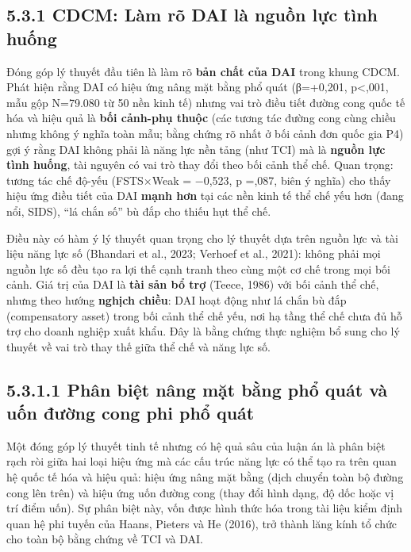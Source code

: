 \documentclass[
  a4paper,
  13pt]{extreport}
\begin{document}
\hypertarget{cdcm-luxe0m-ruxf5-dai-luxe0-nguux1ed3n-lux1ef1c-tuxecnh-huux1ed1ng}{%
\subsection{5.3.1 CDCM: Làm rõ DAI là nguồn lực tình
huống}\label{cdcm-luxe0m-ruxf5-dai-luxe0-nguux1ed3n-lux1ef1c-tuxecnh-huux1ed1ng}}

Đóng góp lý thuyết đầu tiên là làm rõ \textbf{bản chất của DAI} trong
khung CDCM. Phát hiện rằng DAI có hiệu ứng nâng mặt bằng phổ quát
(β=+0,201, p\textless,001, mẫu gộp N=79.080 từ 50 nền kinh tế) nhưng vai
trò điều tiết đường cong quốc tế hóa và hiệu quả là \textbf{bối cảnh-phụ
thuộc} (các tương tác đường cong cùng chiều nhưng không ý nghĩa toàn
mẫu; bằng chứng rõ nhất ở bối cảnh đơn quốc gia P4) gợi ý rằng DAI không
phải là năng lực nền tảng (như TCI) mà là \textbf{nguồn lực tình huống},
tài nguyên có vai trò thay đổi theo bối cảnh thể chế. Quan trọng: tương
tác chế độ-yếu (FSTS×Weak = −0,523, p =,087, biên ý nghĩa) cho thấy hiệu
ứng điều tiết của DAI \textbf{mạnh hơn} tại các nền kinh tế thể chế yếu
hơn (đang nổi, SIDS), ``lá chắn số'' bù đắp cho thiếu hụt thể chế.

Điều này có hàm ý lý thuyết quan trọng cho lý thuyết dựa trên nguồn lực
và tài liệu năng lực số (Bhandari et al., 2023; Verhoef et al., 2021):
không phải mọi nguồn lực số đều tạo ra lợi thế cạnh tranh theo cùng một
cơ chế trong mọi bối cảnh. Giá trị của DAI là \textbf{tài sản bổ trợ}
(Teece, 1986) với bối cảnh thể chế, nhưng theo hướng \textbf{nghịch
chiều}: DAI hoạt động như lá chắn bù đắp (compensatory asset) trong bối
cảnh thể chế yếu, nơi hạ tầng thể chế chưa đủ hỗ trợ cho doanh nghiệp
xuất khẩu. Đây là bằng chứng thực nghiệm bổ sung cho lý thuyết về vai
trò thay thế giữa thể chế và năng lực số.

\hypertarget{phuxe2n-biux1ec7t-nuxe2ng-mux1eb7t-bux1eb1ng-phux1ed5-quuxe1t-vuxe0-uux1ed1n-ux111ux1b0ux1eddng-cong-phi-phux1ed5-quuxe1t}{%
\subsection{5.3.1.1 Phân biệt nâng mặt bằng phổ quát và uốn đường cong
phi phổ
quát}\label{phuxe2n-biux1ec7t-nuxe2ng-mux1eb7t-bux1eb1ng-phux1ed5-quuxe1t-vuxe0-uux1ed1n-ux111ux1b0ux1eddng-cong-phi-phux1ed5-quuxe1t}}

Một đóng góp lý thuyết tinh tế nhưng có hệ quả sâu của luận án là phân
biệt rạch ròi giữa hai loại hiệu ứng mà các cấu trúc năng lực có thể tạo
ra trên quan hệ quốc tế hóa và hiệu quả: hiệu ứng nâng mặt bằng (dịch
chuyển toàn bộ đường cong lên trên) và hiệu ứng uốn đường cong (thay đổi
hình dạng, độ dốc hoặc vị trí điểm uốn). Sự phân biệt này, vốn được hình
thức hóa trong tài liệu kiểm định quan hệ phi tuyến của Haans, Pieters
và He (2016), trở thành lăng kính tổ chức cho toàn bộ bằng chứng về TCI
và DAI.
\end{document}

